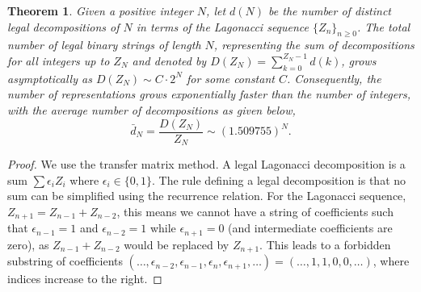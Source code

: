 \documentclass[11pt]{amsart}
\theoremstyle{plain}
\numberwithin{equation}{section} %
\newtheorem{theorem}[thm]{Theorem}
\numberwithin{table}{section} %
\numberwithin{figure}{section}
\begin{document}
	\begin{theorem}
		\label{conj:num_decomps}
		Given a positive integer $N$, let $d(N)$ be the number of distinct legal decompositions of $N$ in terms of the Lagonacci sequence $\{Z_n\}_{n\geq 0}$. The total number of legal binary strings of length $N$, representing the sum of decompositions for all integers up to $Z_{N}$ and denoted by $D(Z_{N})=\sum_{k=0}^{Z_{N}-1}d(k)$, grows asymptotically as $D(Z_{N})\sim C\cdot 2^{N}$ for some constant $C$. Consequently, the number of representations grows exponentially faster than the number of integers, with the average number of decompositions as  given below, $$ \bar{d}_N = \frac{D(Z_N)}{Z_N} \sim (1.509755)^N.$$
	\end{theorem}
	\begin{proof}
		We use the transfer matrix method. A legal Lagonacci decomposition is a sum $\sum \epsilon_i Z_i$ where $\epsilon_i \in \{0,1\}$. The rule defining a legal decomposition is that no sum can be simplified using the recurrence relation. For the Lagonacci sequence, $Z_{n+1} = Z_{n-1} + Z_{n-2}$, this means we cannot have a string of coefficients such that $\epsilon_{n-1}=1$ and $\epsilon_{n-2}=1$ while $\epsilon_{n+1}=0$ (and intermediate coefficients are zero), as $Z_{n-1} + Z_{n-2}$ would be replaced by $Z_{n+1}$. This leads to a forbidden substring of coefficients $(\dots, \epsilon_{n-2}, \epsilon_{n-1}, \epsilon_n, \epsilon_{n+1}, \dots) = (\dots, 1, 1, 0, 0, \dots)$, where indices increase to the right.
		

\end{proof}
\end{document}
